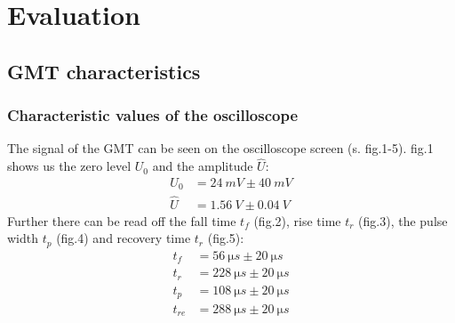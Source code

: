 \chapter{Evaluation}
%
\section{GMT characteristics}
%
\subsection{Characteristic values of the oscilloscope}
%
The signal of the GMT can be seen on the oscilloscope screen (s. fig.1-5). fig.1 shows us the zero level \(U_{0}\) and
the amplitude \(\hat{U}\):
%
\begin{align}
    U_{0}   &=  \SI{24}{mV} \pm \SI{40}{mV} \\
    \hat{U} &=  \SI{1,56}{V} \pm \SI{0,04}{V}
\end{align}
%
Further there can be read off the fall time \(t_{f}\) (fig.2), rise time \(t_{r}\) (fig.3), the pulse width \(t_{p}\)
(fig.4) and recovery time \(t_{r}\) (fig.5):
\begin{align}
    t_{f}   &=  \SI{56}{\micro s} \pm \SI{20}{\micro s} \\
    t_{r}   &=  \SI{228}{\micro s} \pm \SI{20}{\micro s} \\
    t_{p}   &=  \SI{108}{\micro s} \pm \SI{20}{\micro s} \\
    t_{re}  &=  \SI{288}{\micro s} \pm \SI{20}{\micro s}
\end{align}
%
